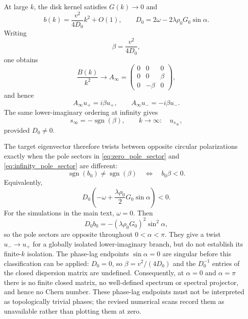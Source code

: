 \documentclass[11pt]{article}
\numberwithin{equation}{section}
\begin{document}
At large $k$, the disk kernel satisfies $\widehat G(k)\to0$ and
\begin{equation}
  b(k)=\frac{v^2}{4D_0}k^2+O(1),
  \qquad
  D_0=2\omega-2\lambda\rho_0G_0\sin\alpha .
\end{equation}
Writing
\begin{equation}
  \beta=\frac{v^2}{4D_0},
\end{equation}
one obtains
\begin{equation}
  \frac{B(k)}{k^2}\longrightarrow
  A_\infty=
  \begin{pmatrix}
  0&0&0\\
  0&0&\beta\\
  0&-\beta&0
  \end{pmatrix},
\end{equation}
and hence
\begin{equation}
  A_\infty u_+=i\beta u_+,\qquad
  A_\infty u_-=-i\beta u_- .
\end{equation}
The same lower-imaginary ordering at infinity gives
\begin{equation}
  s_\infty=-\operatorname{sgn}(\beta),
  \qquad
  k\to\infty:\quad u_{s_\infty},
  \label{eq:infinity_pole_sector}
\end{equation}
provided $D_0\ne0$.

The target eigenvector therefore twists between opposite circular
polarizations exactly when the pole sectors in
\eqref{eq:zero_pole_sector} and \eqref{eq:infinity_pole_sector}
are different:
\begin{equation}
  \operatorname{sgn}(b_0)\ne\operatorname{sgn}(\beta)
  \quad\Longleftrightarrow\quad
  b_0\beta<0 .
  \label{eq:twist_condition_beta}
\end{equation}
Equivalently,
\begin{equation}
  D_0
  \left(
  -\omega+\frac{\lambda\rho_0}{2}G_0\sin\alpha
  \right)<0 .
  \label{eq:twist_condition_general}
\end{equation}
For the simulations in the main text, $\omega=0$. Then
\begin{equation}
  D_0b_0=-(\lambda\rho_0G_0)^2\sin^2\alpha ,
\end{equation}
so the pole sectors are opposite throughout $0<\alpha<\pi$.
They give a twist $u_-\to u_+$ for a globally isolated lower-imaginary
branch, but do not establish its finite-$k$ isolation. The phase-lag endpoints
$\sin\alpha=0$ are singular before this classification can be applied:
$D_0=0$, so $\beta=v^2/(4D_0)$ and the $D_0^{-1}$ entries of the closed
dispersion matrix are undefined. Consequently, at $\alpha=0$ and
$\alpha=\pi$ there is no finite closed matrix, no well-defined spectrum or
spectral projector, and hence no Chern number. These phase-lag endpoints must not be
interpreted as topologically trivial phases; the revised numerical scans
record them as unavailable rather than plotting them at zero.
\end{document}
